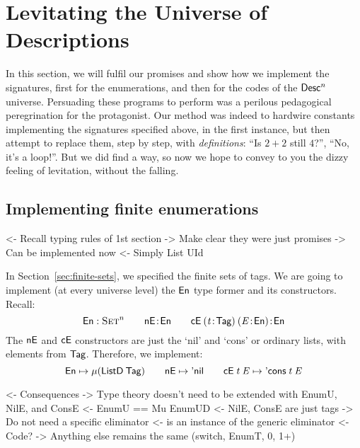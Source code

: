 \section{Levitating the Universe of Descriptions}
\label{sec:desc-levitate}

In this section, we will fulfil our promises and show how we implement
the signatures, first for the enumerations, and then for the codes of
the $\Desc^n$ universe.  Persuading these programs to perform was a perilous
pedagogical peregrination for the protagonist.  Our method was indeed to
hardwire constants implementing the signatures specified above, in the
first instance, but then attempt to replace them, step by step, with
\emph{definitions}: ``Is \(2+2\) still \(4\)?'', ``No, it's a loop!''.
But we did find a way, so now we hope to convey to you the
dizzy feeling of levitation, without the falling.



\subsection{Implementing finite enumerations}

\begin{wstructure}
<- Recall typing rules of 1st section
    -> Make clear they were just promises
    -> Can be implemented now
        <- Simply List UId
\end{wstructure}

In Section~\ref{sec:finite-sets}, we specified the
finite sets of tags. We are going to implement (at every universe level)
the $\EnumU$ type former and its constructors. Recall:
%
\[\Type{\EnumU}^n\qquad\Bhab{\NilE}{\EnumU}\qquad
\Bhab{\ConsE{(\Bhab{\M{t}}{\UId})}{(\Bhab{\M{E}}{\EnumU})}}{\EnumU}
\]
%
The $\NilE$ and $\SYMBConsE$ constructors are just the `nil' and
`cons' or ordinary lists, with elements from \(\UId\).
Therefore, we
implement:
%
\[
\EnumU \mapsto \Mu{(\ListD\: \UId)}
\qquad
\NilE \mapsto \ListNil
\qquad
\ConsE{\M{t}}{\M{E}} \mapsto \ListCons{\M{t}}{\M{E}}
\]


\begin{wstructure}
<- Consequences
    -> Type theory doesn't need to be extended with EnumU, NilE, and ConsE
        <- EnumU == Mu EnumUD
        <- NilE, ConsE are just tags
    -> Do not need a specific \spi eliminator
        <- \spi is an instance of the generic eliminator
            <- Code?
    -> Anything else remains the same (switch, EnumT, 0, 1+)
\end{wstructure}


